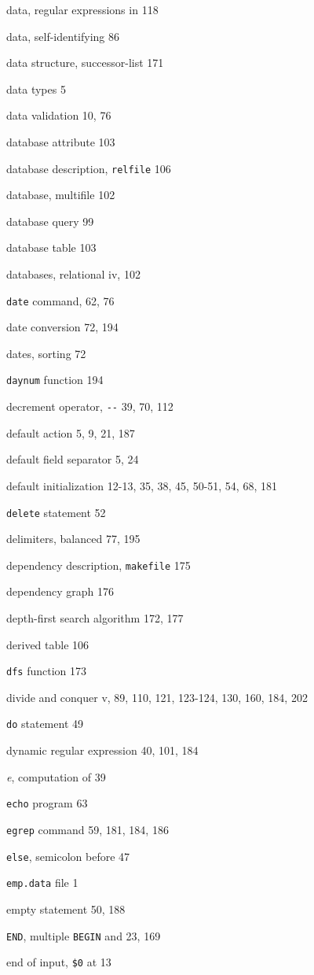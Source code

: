 \begin{multicols}{2}
data, regular expressions in 118

data, self-identifying 86

data structure, successor-list 171

data types 5

data validation 10, 76

database attribute 103

database description, \verb'relfile' 106

database, multifile 102

database query 99

database table 103

databases, relational iv, 102

\verb'date' command, 62, 76

date conversion 72, 194

dates, sorting 72

\verb'daynum' function 194

decrement operator, \verb'--' 39, 70, 112

default action 5, 9, 21, 187

default field separator 5, 24

default initialization 12-13, 35, 38, 45, 50-51, 54, 68, 181

\verb'delete' statement 52

delimiters, balanced 77, 195

dependency description, \verb'makefile' 175

dependency graph 176

depth-first search algorithm 172, 177

derived table 106

\verb'dfs' function 173

divide and conquer v, 89, 110, 121, 123-124, 130, 160, 184, 202

\verb'do' statement 49

dynamic regular expression 40, 101, 184

\textit{e}, computation of 39

\verb'echo' program 63

\verb'egrep' command 59, 181, 184, 186

\verb'else', semicolon before 47

\verb'emp.data' file 1

empty statement 50, 188

\verb'END', multiple \verb'BEGIN' and 23, 169

end of input, \verb'$0' at 13


\end{multicols}
